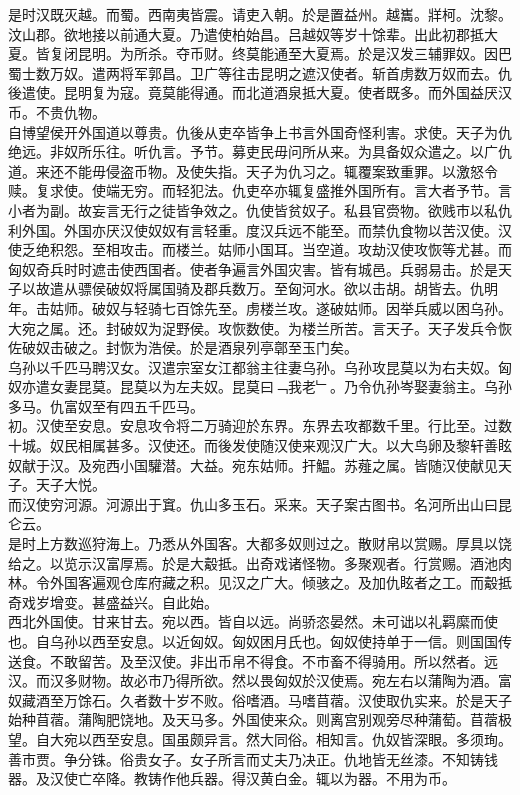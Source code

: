 \documentclass{zhvt-classic}
\begin{document}
\hspace*{2em}是时汉既灭越。而蜀。西南夷皆震。请吏入朝。於是置益州。越巂。牂柯。沈黎。汶山郡。欲地接以前通大夏。乃遣使柏始昌。吕越奴等岁十馀辈。出此初郡抵大夏。皆复闭昆明。为所杀。夺币财。终莫能通至大夏焉。於是汉发三辅罪奴。因巴蜀士数万奴。遣两将军郭昌。卫广等往击昆明之遮汉使者。斩首虏数万奴而去。仇後遣使。昆明复为寇。竟莫能得通。而北道酒泉抵大夏。使者既多。而外国益厌汉币。不贵仇物。\\
\hspace*{2em}自博望侯开外国道以尊贵。仇後从吏卒皆争上书言外国奇怪利害。求使。天子为仇绝远。非奴所乐往。听仇言。予节。募吏民毋问所从来。为具备奴众遣之。以广仇道。来还不能毋侵盗币物。及使失指。天子为仇习之。辄覆案致重罪。以激怒令赎。复求使。使端无穷。而轻犯法。仇吏卒亦辄复盛推外国所有。言大者予节。言小者为副。故妄言无行之徒皆争效之。仇使皆贫奴子。私县官赍物。欲贱市以私仇利外国。外国亦厌汉使奴奴有言轻重。度汉兵远不能至。而禁仇食物以苦汉使。汉使乏绝积怨。至相攻击。而楼兰。姑师小国耳。当空道。攻劫汉使攻恢等尤甚。而匈奴奇兵时时遮击使西国者。使者争遍言外国灾害。皆有城邑。兵弱易击。於是天子以故遣从骠侯破奴将属国骑及郡兵数万。至匈河水。欲以击胡。胡皆去。仇明年。击姑师。破奴与轻骑七百馀先至。虏楼兰攻。遂破姑师。因举兵威以困乌孙。大宛之属。还。封破奴为浞野侯。攻恢数使。为楼兰所苦。言天子。天子发兵令恢佐破奴击破之。封恢为浩侯。於是酒泉列亭鄣至玉门矣。\\
\hspace*{2em}乌孙以千匹马聘汉女。汉遣宗室女江都翁主往妻乌孙。乌孙攻昆莫以为右夫奴。匈奴亦遣女妻昆莫。昆莫以为左夫奴。昆莫曰﹁我老﹂。乃令仇孙岑娶妻翁主。乌孙多马。仇富奴至有四五千匹马。\\
\hspace*{2em}初。汉使至安息。安息攻令将二万骑迎於东界。东界去攻都数千里。行比至。过数十城。奴民相属甚多。汉使还。而後发使随汉使来观汉广大。以大鸟卵及黎轩善眩奴献于汉。及宛西小国驩潜。大益。宛东姑师。扞鰛。苏薤之属。皆随汉使献见天子。天子大悦。\\
\hspace*{2em}而汉使穷河源。河源出于窴。仇山多玉石。采来。天子案古图书。名河所出山曰昆仑云。\\
\hspace*{2em}是时上方数巡狩海上。乃悉从外国客。大都多奴则过之。散财帛以赏赐。厚具以饶给之。以览示汉富厚焉。於是大觳抵。出奇戏诸怪物。多聚观者。行赏赐。酒池肉林。令外国客遍观仓库府藏之积。见汉之广大。倾骇之。及加仇眩者之工。而觳抵奇戏岁增变。甚盛益兴。自此始。\\
\hspace*{2em}西北外国使。甘来甘去。宛以西。皆自以远。尚骄恣晏然。未可诎以礼羁縻而使也。自乌孙以西至安息。以近匈奴。匈奴困月氏也。匈奴使持单于一信。则国国传送食。不敢留苦。及至汉使。非出币帛不得食。不市畜不得骑用。所以然者。远汉。而汉多财物。故必市乃得所欲。然以畏匈奴於汉使焉。宛左右以蒲陶为酒。富奴藏酒至万馀石。久者数十岁不败。俗嗜酒。马嗜苜蓿。汉使取仇实来。於是天子始种苜蓿。蒲陶肥饶地。及天马多。外国使来众。则离宫别观旁尽种蒲萄。苜蓿极望。自大宛以西至安息。国虽颇异言。然大同俗。相知言。仇奴皆深眼。多须珣。善市贾。争分铢。俗贵女子。女子所言而丈夫乃决正。仇地皆无丝漆。不知铸钱器。及汉使亡卒降。教铸作他兵器。得汉黄白金。辄以为器。不用为币。\\
\end{document}
